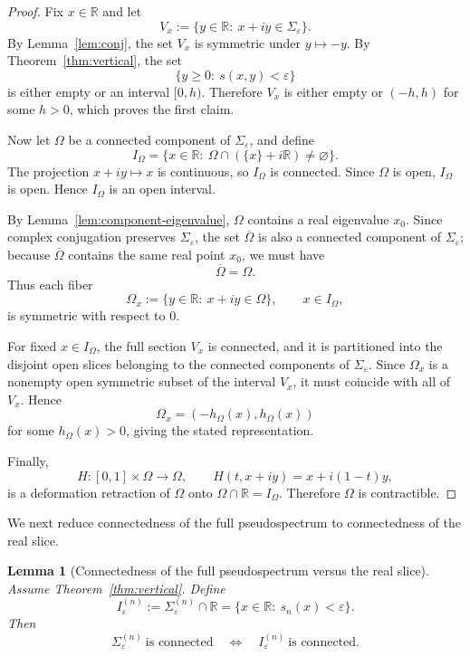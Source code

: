 \documentclass[11pt]{article}
\numberwithin{equation}{section}
\newtheorem{lemma}[theorem]{Lemma}
\newcommand{\R}{\mathbb R}
\begin{document}
\begin{proof}
Fix \(x\in\R\) and let
\[
V_x:=\{y\in\R:\ x+iy\in\Sigma_\varepsilon\}.
\]
By Lemma~\ref{lem:conj}, the set \(V_x\) is symmetric under \(y\mapsto -y\).
By Theorem~\ref{thm:vertical}, the set
\[
\{y\ge0:\ s(x,y)<\varepsilon\}
\]
is either empty or an interval \([0,h)\).  Therefore \(V_x\) is either empty or
\(
(-h,h)
\)
for some \(h>0\), which proves the first claim.

Now let \(\Omega\) be a connected component of \(\Sigma_\varepsilon\), and define
\[
I_\Omega
=
\{x\in\R:\ \Omega\cap(\{x\}+i\R)\neq\varnothing\}.
\]
The projection \(x+iy\mapsto x\) is continuous, so \(I_\Omega\) is connected.
Since \(\Omega\) is open, \(I_\Omega\) is open.  Hence \(I_\Omega\) is an open interval.

By Lemma~\ref{lem:component-eigenvalue}, \(\Omega\) contains a real eigenvalue
\(x_0\).  Since complex conjugation preserves \(\Sigma_\varepsilon\), the set
\(\overline{\Omega}\) is also a connected component of \(\Sigma_\varepsilon\); because
\(\overline{\Omega}\) contains the same real point \(x_0\), we must have
\[
\overline{\Omega}=\Omega.
\]
Thus each fiber
\[
\Omega_x:=\{y\in\R:\ x+iy\in\Omega\},\qquad x\in I_\Omega,
\]
is symmetric with respect to \(0\).

For fixed \(x\in I_\Omega\), the full section \(V_x\) is connected, and it is partitioned
into the disjoint open slices belonging to the connected components of
\(\Sigma_\varepsilon\).  Since \(\Omega_x\) is a nonempty open symmetric subset of the
interval \(V_x\), it must coincide with all of \(V_x\).  Hence
\[
\Omega_x=(-h_\Omega(x),h_\Omega(x))
\]
for some \(h_\Omega(x)>0\), giving the stated representation.

Finally,
\[
H:[0,1]\times\Omega\to\Omega,\qquad
H(t,x+iy)=x+i(1-t)y,
\]
is a deformation retraction of \(\Omega\) onto \(\Omega\cap\R=I_\Omega\).  Therefore
\(\Omega\) is contractible.
\end{proof}

We next reduce connectedness of the full pseudospectrum to connectedness of the
real slice.

\begin{lemma}[Connectedness of the full pseudospectrum versus the real slice]
\label{lem:real-slice-connected}
Assume Theorem~\ref{thm:vertical}. Define
\[
I_\varepsilon^{(n)}
:=
\Sigma_\varepsilon^{(n)}\cap\R
=
\{x\in\R:\ s_n(x)<\varepsilon\}.
\]
Then
\[
\Sigma_\varepsilon^{(n)}\ \text{is connected}
\quad\Longleftrightarrow\quad
I_\varepsilon^{(n)}\ \text{is connected}.
\]
\end{lemma}
\end{document}
